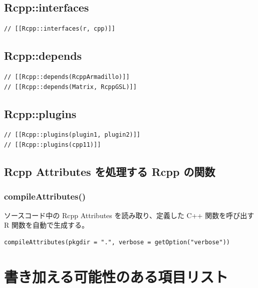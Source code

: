 \documentclass[]{book}
\begin{document}
\hypertarget{rcppinterfaces}{%
\section{Rcpp::interfaces}\label{rcppinterfaces}}

\begin{verbatim}
// [[Rcpp::interfaces(r, cpp)]]
\end{verbatim}

\hypertarget{rcppdepends}{%
\section{Rcpp::depends}\label{rcppdepends}}

\begin{verbatim}
// [[Rcpp::depends(RcppArmadillo)]]
// [[Rcpp::depends(Matrix, RcppGSL)]]
\end{verbatim}

\hypertarget{rcppplugins}{%
\section{Rcpp::plugins}\label{rcppplugins}}

\begin{verbatim}
// [[Rcpp::plugins(plugin1, plugin2)]]
// [[Rcpp::plugins(cpp11)]]
\end{verbatim}

\hypertarget{rcpp-attributes--rcpp-}{%
\section{Rcpp Attributes を処理する Rcpp の関数}\label{rcpp-attributes--rcpp-}}

\hypertarget{compileattributes}{%
\subsection{compileAttributes()}\label{compileattributes}}

ソースコード中の Rcpp Attributes を読み取り、定義した C++ 関数を呼び出す R 関数を自動で生成する。

\begin{verbatim}
compileAttributes(pkgdir = ".", verbose = getOption("verbose"))

\end{verbatim}

\chapter{書き加える可能性のある項目リスト}
\end{document}
